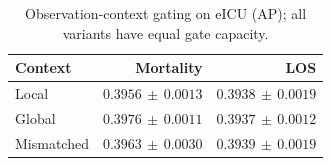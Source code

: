 \begin{table}[tp]
\centering\footnotesize
\setlength{\tabcolsep}{3pt}
\caption{Observation-context gating on eICU (AP); all variants have equal gate capacity.}
\label{tab:context}
\begin{tabular}{lrr}
\toprule
Context & Mortality & LOS \\
\midrule
Local & $0.3956\,\pm\,0.0013$ & $0.3938\,\pm\,0.0019$ \\
Global & $0.3976\,\pm\,0.0011$ & $0.3937\,\pm\,0.0012$ \\
Mismatched & $0.3963\,\pm\,0.0030$ & $0.3939\,\pm\,0.0019$ \\
\bottomrule
\end{tabular}
\end{table}
